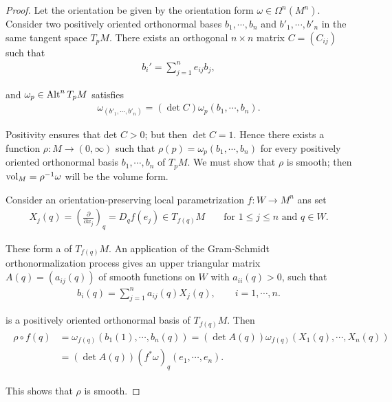 \begin{proof}
  Let the orientation be given by the orientation form $\omega\in\Omega^n(M^n)$. Consider
two positively oriented orthonormal bases $b_1, \cdots, b_n$ and $b'_1, \cdots, b'_n$ in the 
same tangent space $T_pM$. There exists an orthogonal $n\times n$ matrix $C = (C_{ij})$ such 
that
\begin{align*}
  b_i' = \sum_{j=1}^{n }{e_{ij}b_j},
\end{align*}

and $\omega_p\in\operatorname{Alt}^n T_pM$ satisfies 
\begin{align}
  \omega_(b'_1, \cdots, b'_n) = (\det C) \omega_p (b_1, \cdots, b_n).
\end{align}

Positivity ensures that det $C > 0$; but then $\det C = 1$. Hence there exists a
function $\rho:M\to (0,\infty)$ such that $\rho(p) = \omega_p(b_1, \cdots, b_n)$ for every 
positively oriented orthonormal basis $b_1, \cdots, b_n$ of $T_pM$. We must show that $\rho$ is 
smooth; then $\mathrm{vol}_M = \rho^{-1}\omega$ will be the volume form.

Consider an orientation-preserving local parametrization $f:W\to M^n$ ans set 
\begin{align*}
  X_j(q) = \left(\frac{\partial }{\partial x_j }\right)_q 
  = D_q f(e_j) \in T_{f(q)}M 
  && \text{ for } 1\le j\le n\text{ and } q\in W.
\end{align*}

These form a  of $T_{f(q)}M$. An application of the
Gram-Schmidt orthonormalization process gives an upper triangular matrix
$A(q) = (a_{ij}(q))$ of smooth functions on $W$ with $a_{ii}(q) > 0$, such that
\begin{align}\label{eq:9-13}
  b_i(q) = \sum_{j=1 }^{n}{ a_{ij}(q)X_j(q) }, \qquad i=1, \cdots, n.
\end{align}

is a positively oriented orthonormal basis of $T_{f(q)}M$. Then
\begin{align}\label{eq:9-14}
  \begin{aligned}
    \rho\circ f(q) 
      & = \omega_{f(q)}(b_1(1), \cdots, b_n(q))
        = (\det A(q))\omega_{f(q)}(X_1(q), \cdots, X_n(q))\\
      & = (\det A(q))(f^*\omega)_q (e_1, \cdots, e_n).
  \end{aligned}
\end{align}

This shows that $\rho$ is smooth.
\end{proof}


